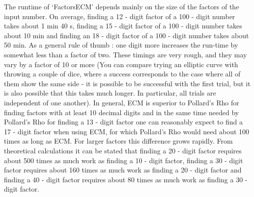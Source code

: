 The runtime of `FactorsECM' depends mainly on the size of the factors
of the input number.
On average, finding a 12 - digit factor of a 100 - digit number
takes about 1 min 40 s, finding a 15 - digit factor of a 100 - digit
number takes about 10 min and finding an 18 - digit factor of a 100 -
digit number takes about 50 min.
As a general rule of thumb : one digit more increases the run-time
by somewhat less than a factor of two.
These timings are very rough, and they may vary by a factor of 10 or more
(You can compare trying an elliptic curve with throwing a couple of dice,
where a success corresponds to the case where all of them show the same
side - it is possible to be successful with the first trial, but it is
also possible that this takes much longer. In particular, all trials are
independent of one another).
In general, ECM is superior to Pollard's Rho for finding factors with at
least 10 decimal digits and in the same time needed by Pollard's Rho for
finding a 13 - digit factor one can reasonably expect to find a
17 - digit factor when using ECM, for which Pollard's Rho would need 
about 100 times as long as ECM. For larger factors this difference
grows rapidly.
From theoretical calculations it can be stated that finding a
20 - digit factor requires about 500 times as much work as finding a
10 - digit factor, finding a 30 - digit factor requires about 160 times
as much work as finding a 20 - digit factor and finding a 40 - digit
factor requires about 80 times as much work as finding a 30 - digit
factor.

